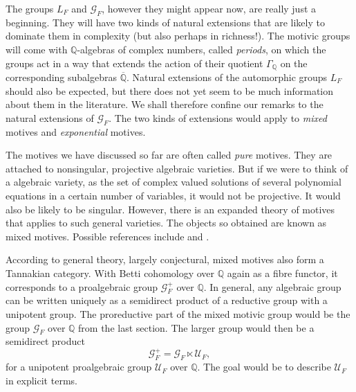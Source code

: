\documentclass[preprint,12pt, leqno]{elsarticle}
\newcommand{\UGal}{\mathcal{G}_F}
\newcommand{\mQ}{\mathbb{Q}}
\newcommand{\ubf}[1]{\textit{#1}}
\numberwithin{equation}{section}
\theoremstyle{named}
\begin{document}
The groups $L_F$ and $\UGal$, however they might appear now, are really just a beginning. They will have two kinds of natural extensions that are likely to dominate them in complexity (but also perhaps in richness!). The motivic groups will come with $\mQ$-algebras of complex numbers, called \ubf{periods}, on which the groups act in a way that extends the action of their quotient $\Gamma_{\mQ}$ on the corresponding subalgebras $\overline{\mQ}$. Natural extensions of the automorphic groups $L_F$ should also be expected, but there does not yet seem to be much information about them in the literature. We shall therefore confine our remarks to the natural extensions of $\UGal$. The two kinds of extensions would apply to \ubf{mixed} motives and \ubf{exponential} motives.

The motives we have discussed so far are often called \ubf{pure} motives. They are attached to nonsingular, projective algebraic varieties. But if we were to think of a  algebraic variety, as the set of complex valued solutions of several polynomial equations in a certain number of variables, it would not be projective. It would also be likely to be singular. However, there is an expanded theory of motives that applies to such general varieties. The objects so obtained are known as mixed motives. Possible references include \cite{Andre1} and \cite{H}.

According to general theory, largely conjectural, mixed motives also form a Tannakian category. With Betti cohomology over $\mQ$ again as a fibre functor, it corresponds to a proalgebraic group $\UGal^+$ over $\mQ$. In general, any algebraic group can be written uniquely as a semidirect product of a reductive group with a unipotent group. The proreductive part of the mixed motivic group would be the group $\UGal$ over $\mQ$ from the last section. The larger group would then be a semidirect product
\begin{equation*}
    \mathcal{G}^+_F = \mathcal{G}_F \ltimes \mathcal{U}_F,
\end{equation*}
for a unipotent proalgebraic group $\mathcal{U}_F$ over $\mathbb{Q}$. The goal would be to describe $\mathcal{U}_F$ in explicit terms.
\end{document}
